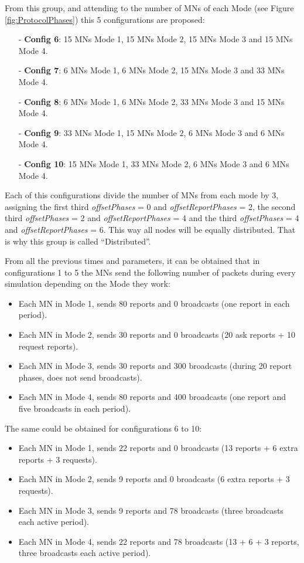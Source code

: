 \begin{itemize}
From this group, and attending to the number of \acp{MN} of each Mode (see Figure \ref{fig:ProtocolPhases}) this 5 configurations are proposed:
\begin{itemize}
 \item[-] \textbf{Config 6}: 15 \acp{MN} Mode 1, 15 \acp{MN} Mode 2, 15 \acp{MN} Mode 3 and 15 \acp{MN} Mode 4.
 \item[-] \textbf{Config 7}: 6 \acp{MN} Mode 1, 6 \acp{MN} Mode 2, 15 \acp{MN} Mode 3 and 33 \acp{MN} Mode 4.
 \item[-] \textbf{Config 8}: 6 \acp{MN} Mode 1, 6 \acp{MN} Mode 2, 33 \acp{MN} Mode 3 and 15 \acp{MN} Mode 4.
 \item[-] \textbf{Config 9}: 33 \acp{MN} Mode 1, 15 \acp{MN} Mode 2, 6 \acp{MN} Mode 3 and 6 \acp{MN} Mode 4.
 \item[-] \textbf{Config 10}: 15 \acp{MN} Mode 1, 33 \acp{MN} Mode 2, 6 \acp{MN} Mode 3 and 6 \acp{MN} Mode 4.
\end{itemize}
Each of this configurations divide the number of \acp{MN} from each mode by 3, assigning the first third \textit{offsetPhases} = 0 and 
\textit{offsetReportPhases} = 2, the second third \textit{offsetPhases} = 2 and \textit{offsetReportPhases} = 4 and the third
\textit{offsetPhases} = 4 and \textit{offsetReportPhases} = 6. This way all nodes will be equally distributed. That is why this group is called
``Distributed''. 
\end{itemize}

From all the previous times and parameters, it can be obtained that in configurations 1 to 5 the \acp{MN} send the following number of packets during
every simulation depending on the Mode they work:
\begin{itemize}
 \item Each \ac{MN} in Mode 1, sends 80 reports and 0 broadcasts (one report in each period).
 \item Each \ac{MN} in Mode 2, sends 30 reports and 0 broadcasts (20 ask reports + 10 request reports).
 \item Each \ac{MN} in Mode 3, sends 30 reports and 300 broadcasts (during 20 report phases, does not send broadcasts).
 \item Each \ac{MN} in Mode 4, sends 80 reports and 400 broadcasts (one report and five broadcasts in each period).
\end{itemize}
The same could be obtained for configurations 6 to 10:
\begin{itemize}
 \item Each \ac{MN} in Mode 1, sends 22 reports and 0 broadcasts (13 reports + 6 extra reports + 3 requests).
 \item Each \ac{MN} in Mode 2, sends 9 reports and 0 broadcasts (6 extra reports + 3 requests).
 \item Each \ac{MN} in Mode 3, sends 9 reports and 78 broadcasts (three broadcasts each active period).
 \item Each \ac{MN} in Mode 4, sends 22 reports and 78 broadcasts (13 + 6 + 3 reports, three broadcasts each active period).
\end{itemize}

